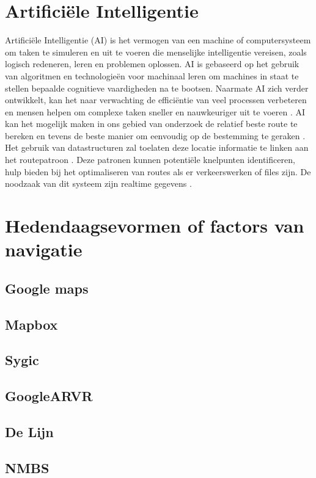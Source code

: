 \section{Artificiële Intelligentie}
\label{sec:artificiële intelligentie}
Artificiële Intelligentie (AI) is het vermogen van een machine of computersysteem om taken te simuleren en uit te voeren die menselijke intelligentie vereisen, zoals logisch redeneren, leren en problemen oplossen. AI is gebaseerd op het gebruik van algoritmen en technologieën voor machinaal leren om machines in staat te stellen bepaalde cognitieve vaardigheden na te bootsen. Naarmate AI zich verder ontwikkelt, kan het naar verwachting de efficiëntie van veel processen verbeteren en mensen helpen om complexe taken sneller en nauwkeuriger uit te voeren \autocite{Sabouret2020}. AI kan het mogelijk maken in ons gebied van onderzoek de relatief beste route te bereken en tevens de beste manier om eenvoudig op de bestemming te geraken \autocite{Soni2023a}. Het gebruik van datastructuren zal toelaten deze locatie informatie te linken aan het routepatroon \autocite{Ruta2010}. Deze patronen kunnen potentiële knelpunten identificeren, hulp bieden bij het optimaliseren van routes als er verkeerswerken of files zijn. De noodzaak van dit systeem zijn realtime gegevens \autocite{Ciravegna2018}.
\section{Hedendaagsevormen of factors van navigatie}
\label{sec:literatuuroverzicht}
\subsection{Google maps}
\label{sec:google maps}
\subsection{Mapbox}
\label{sec:mapbox}
\subsection{Sygic}
\label{sec:sygic}
\subsection{GoogleARVR}
\label{sec:googlearvr}
\subsection{De Lijn}
\label{sec:delijn}
\subsection{NMBS}
\label{sec:nmbs}
